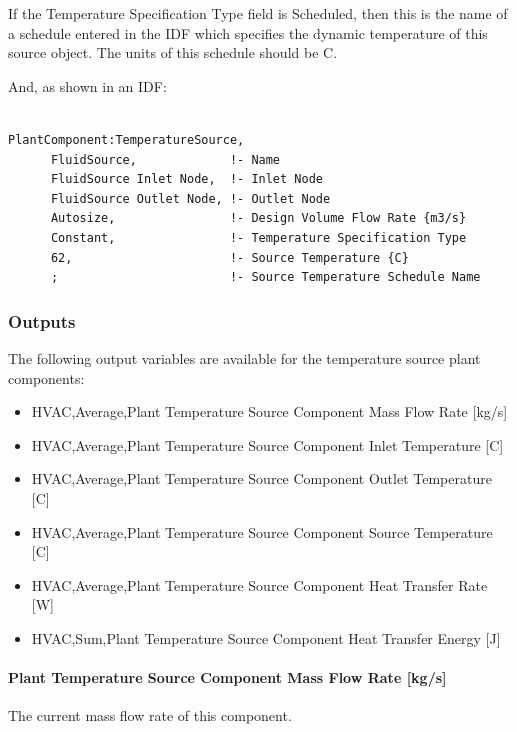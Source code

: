 If the Temperature Specification Type field is Scheduled, then this is the name of a schedule entered in the IDF which specifies the dynamic temperature of this source object. The units of this schedule should be C.

And, as shown in an IDF:

\begin{lstlisting}

PlantComponent:TemperatureSource,
      FluidSource,             !- Name
      FluidSource Inlet Node,  !- Inlet Node
      FluidSource Outlet Node, !- Outlet Node
      Autosize,                !- Design Volume Flow Rate {m3/s}
      Constant,                !- Temperature Specification Type
      62,                      !- Source Temperature {C}
      ;                        !- Source Temperature Schedule Name
\end{lstlisting}

\subsubsection{Outputs}\label{outputs-16-000}

The following output variables are available for the temperature source plant components:

\begin{itemize}
\item
  HVAC,Average,Plant Temperature Source Component Mass Flow Rate {[}kg/s{]}
\item
  HVAC,Average,Plant Temperature Source Component Inlet Temperature {[}C{]}
\item
  HVAC,Average,Plant Temperature Source Component Outlet Temperature {[}C{]}
\item
  HVAC,Average,Plant Temperature Source Component Source Temperature {[}C{]}
\item
  HVAC,Average,Plant Temperature Source Component Heat Transfer Rate {[}W{]}
\item
  HVAC,Sum,Plant Temperature Source Component Heat Transfer Energy {[}J{]}
\end{itemize}

\paragraph{Plant Temperature Source Component Mass Flow Rate {[}kg/s{]}}\label{plant-temperature-source-component-mass-flow-rate-kgs}

The current mass flow rate of this component.

